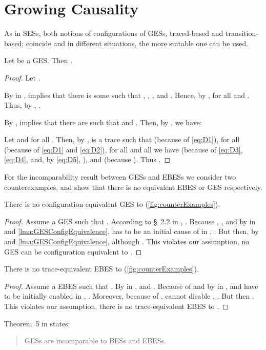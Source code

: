 \documentclass[runningheads,a4paper]{llncs}
\begin{document}
\section{Growing Causality}
As in SESs, both notions of configurations of GESs, traced-based and
transition-based; coincide and in different situations, the more suitable one
can be used.
\begin{lemma}\label{lma:GESConfigEquivalence}
	Let  be a GES. Then .
\end{lemma}
\begin{proof}
	Let .
	
	By  in \cite{dynamicCausality15},  implies that there is some  such that , , , and . Hence, by ,  for all  and .	Thus, by , .
	
	By ,  implies that there are  such that  and .
	Then, by , we have:
	
	Let  and  for all .	Then, by ,  is a trace such that  (because of \eqref{eq:D1}),  for all  (because of \eqref{eq:D1} and \eqref{eq:D2}), for all  and all  we have  (because of \eqref{eq:D3}, \eqref{eq:D4}, and, by \eqref{eq:D5}, ), and  (because ).
	Thus .
\end{proof}

For the incomparability result between GESs and EBESs we consider two
counterexamples, and show that there is no equivalent EBES or GES respectively.
\begin{lemma}\label{lma:EBESninGES}
	There is no configuration-equivalent GES to  (\cf \fig\ref{fig:counterExamples}).
\end{lemma}

\begin{proof}
	Assume a GES  such that .	According to \S~2.2 in \cite{dynamicCausality15}, . Because , , and by  in \cite{dynamicCausality15} and \lem\ref{lma:GESConfigEquivalence},  has to be an initial cause of  in , \ie .	But then, by  and \lem\ref{lma:GESConfigEquivalence},  although . This violates our assumption, \ie no GES can be configuration equivalent to .
\end{proof}
\begin{lemma}\label{lma:GESninEBES}
	There is no trace-equivalent EBES to  (\cf \fig\ref{fig:counterExamples}).
\end{lemma}
\begin{proof}
	Assume a EBES  such that . By  in \cite{dynamicCausality15},  and . Because of  and by  in \cite{dynamicCausality15},  and  have to be initially enabled in , \ie .	Moreover, because of ,  cannot disable , \ie . But then . This violates our assumption, \ie there is no trace-equivalent EBES to .
\end{proof}
Theorem~5 in \cite{dynamicCausality15} states:
\begin{quote}
	GESs are incomparable to BESs and EBESs.
\end{quote}
\end{document}
